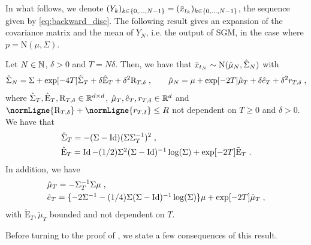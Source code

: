 In what follows, we denote
$(Y_k)_{k \in \{0, \dots, N-1\}} = (\bar{x}_{t_k})_{k \in \{0, \dots, N-1\}}$, the
sequence given by \eqref{eq:backward_disc}. The following result gives an
expansion of the covariance matrix and the mean of $Y_N$, i.e. the output of
SGM, in the case where $p = \mathrm{N}(\mu, \Sigma)$.

\begin{theorem}
  \label{prop:approx_gaussian}
  Let $N \in \mathbb{N}$, $\delta > 0$ and $T = N \delta$. Then, we have that
  $\bar{x}_{t_N} \sim \mathrm{N}(\hat{\mu}_N, \hat{\Sigma}_N)$ with
  \begin{equation}
    \hat{\Sigma}_N = \Sigma + \exp[-4T] \hat{\Sigma}_T + \delta \hat{\mathrm{E}}_T + \delta^2 \mathrm{R}_{T, \delta} \; , \qquad \hat{\mu}_N = \mu + \exp[-2T] \hat{\mu}_T + \delta \hat{e}_T + \delta^2 r_{T, \delta} \; ,
  \end{equation}
  where
  $\hat{\Sigma}_T, \hat{\mathrm{E}}_T, \mathrm{R}_{T, \delta} \in \mathbb{R}^{d
    \times d}$, $\hat{\mu}_T, \hat{e}_T, r_{T, \delta} \in \mathbb{R}^d$ and
  $\normLigne{\mathrm{R}_{T, \delta}} + \normLigne{r_{T, \delta}} \leq R$ not
  dependent on $T \geq 0$ and $\delta >0$. We have that
  \begin{align}
  &\hat{\Sigma}_T =  - (\Sigma - \operatorname{Id})(\Sigma \Sigma_T^{-1})^{2}  \; , \label{eq:T_approx}\\
    &\textstyle{ \hat{\mathrm{E}}_T = \operatorname{Id}- (1/2)\Sigma^2 (\Sigma - \operatorname{Id})^{-1} \log(\Sigma)  + \exp[-2T] \tilde{\mathrm{E}}_T\;.} \label{eq:gamma_approx}
  \end{align}
  In addition, we have 
  \begin{align}
    &\hat{\mu}_T = - \Sigma_T^{-1}\Sigma \mu \; ,  \\
    &\textstyle{ \hat{e}_T = \{-2 \Sigma^{-1} -  (1/4) \Sigma (\Sigma - \operatorname{Id})^{-1} \log(\Sigma)\} \mu + \exp[-2T] \tilde{\mu}_T \;,  }
  \end{align}
  with $\tilde{\mathrm{E}}_T, \tilde \mu_T$ bounded and not dependent on $T$.
\end{theorem}

Before turning to the proof of , we state a few
consequences of this result.


